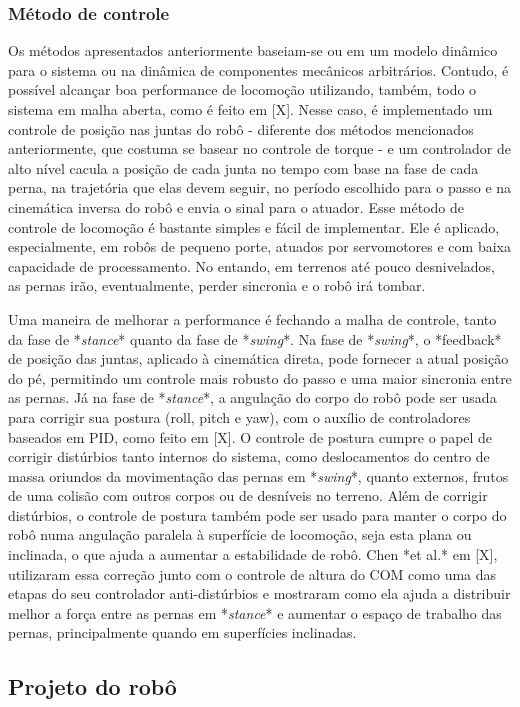 \documentclass[../main.tex]{subfiles}
\begin{document}
  \subsubsection{Método de controle}
  Os métodos apresentados anteriormente baseiam-se ou em um modelo dinâmico para o sistema ou na dinâmica de componentes mecânicos arbitrários. Contudo, é possível alcançar boa performance de locomoção utilizando, também, todo o sistema em malha aberta, como é feito em [X]. Nesse caso, é implementado um controle de posição nas juntas do robô - diferente dos métodos mencionados anteriormente, que costuma se basear no controle de torque - e um controlador de alto nível cacula a posição de cada junta no tempo com base na fase de cada perna, na trajetória que elas devem seguir, no período escolhido para o passo e na cinemática inversa do robô e envia o sinal para o atuador. Esse método de controle de locomoção é bastante simples e fácil de implementar. Ele é aplicado, especialmente, em robôs de pequeno porte, atuados por servomotores e com baixa capacidade de processamento. No entando, em terrenos até pouco desnivelados, as pernas irão, eventualmente, perder sincronia e o robô irá tombar.

  Uma maneira de melhorar a performance é fechando a malha de controle, tanto da fase de *\textit{stance}* quanto da fase de *\textit{swing}*. Na fase de *\textit{swing}*, o *feedback* de posição das juntas, aplicado à cinemática direta, pode fornecer a atual posição do pé, permitindo um controle mais robusto do passo e uma maior sincronia entre as pernas. Já na fase de *\textit{stance}*, a angulação do corpo do robô  pode ser usada para corrigir sua postura (roll, pitch e yaw), com o auxílio de controladores baseados em PID, como feito em [X]. O controle de postura cumpre o papel de corrigir distúrbios tanto internos do sistema, como deslocamentos do centro de massa oriundos da movimentação das pernas em *\textit{swing}*, quanto externos, frutos de uma colisão com outros corpos ou de desníveis no terreno. Além de corrigir distúrbios, o controle de postura também pode ser usado para manter o corpo do robô numa angulação paralela à superfície de locomoção, seja esta plana ou inclinada, o que ajuda a aumentar a estabilidade de robô. Chen *et al.* em [X], utilizaram essa correção junto com o controle de altura do COM como uma das etapas do seu controlador anti-distúrbios e mostraram como ela ajuda a distribuir melhor a força entre as pernas em *\textit{stance}* e aumentar o espaço de trabalho das pernas, principalmente quando em superfícies inclinadas.

  \subsection{Projeto do robô}
  
\end{document}
